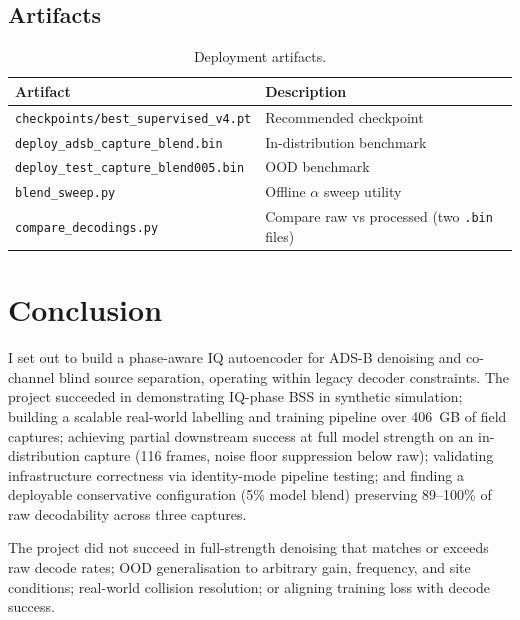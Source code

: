 \documentclass[11pt,a4paper]{article}
\begin{document}
\subsection{Artifacts}

\begin{table}[htbp]
  \centering
  \caption{Deployment artifacts.}
  \label{tab:artifacts}
  \begin{tabular}{@{}ll@{}}
    \toprule
    Artifact & Description \\
    \midrule
    \texttt{checkpoints/best\_supervised\_v4.pt} & Recommended checkpoint \\
    \texttt{deploy\_adsb\_capture\_blend.bin} & In-distribution benchmark \\
    \texttt{deploy\_test\_capture\_blend005.bin} & OOD benchmark \\
    \texttt{blend\_sweep.py} & Offline $\alpha$ sweep utility \\
    \texttt{compare\_decodings.py} & Compare raw vs processed (two \texttt{.bin} files) \\
    \bottomrule
  \end{tabular}
\end{table}

\section{Conclusion}

I set out to build a phase-aware IQ autoencoder for ADS-B denoising and
co-channel blind source separation, operating within legacy decoder
constraints. The project succeeded in demonstrating IQ-phase BSS in synthetic
simulation; building a scalable real-world labelling and training pipeline over
406~GB of field captures; achieving partial downstream success at full model
strength on an in-distribution capture (116 frames, noise floor suppression
below raw); validating infrastructure correctness via identity-mode pipeline
testing; and finding a deployable conservative configuration (5\% model blend)
preserving 89--100\% of raw decodability across three captures.

The project did not succeed in full-strength denoising that matches or exceeds
raw decode rates; OOD generalisation to arbitrary gain, frequency, and site
conditions; real-world collision resolution; or aligning training loss with
decode success.
\end{document}
